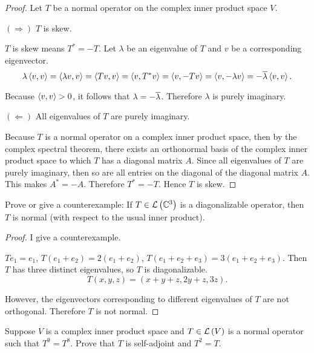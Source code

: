 \begin{proof}
    Let $T$ be a normal operator on the complex inner product space $V$.

    $(\Rightarrow)$ $T$ is skew.

    $T$ is skew means $T^{*} = -T$. Let $\lambda$ be an eigenvalue of $T$ and $v$ be a corresponding eigenvector.
    \[
        \lambda\left\langle{v, v}\right\rangle = \left\langle{\lambda v, v}\right\rangle = \left\langle{Tv, v}\right\rangle = \left\langle{v, T^{*}v}\right\rangle = \left\langle{v, -Tv}\right\rangle = \left\langle{v, -\lambda v}\right\rangle = -\overline{\lambda}\left\langle{v, v}\right\rangle.
    \]

    Because $\left\langle{v, v}\right\rangle > 0$, it follows that $\lambda = -\overline{\lambda}$. Therefore $\lambda$ is purely imaginary.

    $(\Leftarrow)$ All eigenvalues of $T$ are purely imaginary.

    Because $T$ is a normal operator on a complex inner product space, then by the complex spectral theorem, there exists an orthonormal basis of the complex inner product space to which $T$ has a diagonal matrix $A$. Since all eigenvalues of $T$ are purely imaginary, then so are all entries on the diagonal of the diagonal matrix $A$. This makes $A^{*} = -A$. Therefore $T^{*} = -T$. Hence $T$ is skew.
\end{proof}
\newpage

\begin{exercise}
    Prove or give a counterexample: If $T \in \mathcal{L}\left({\mathbb{C}^{3}}\right)$ is a diagonalizable operator, then $T$ is normal (with respect to the usual inner product).
\end{exercise}

\begin{proof}
    I give a counterexample.

    $Te_{1} = e_{1}$, $T(e_{1} + e_{2}) = 2(e_{1} + e_{2})$, $T(e_{1} + e_{2} + e_{3}) = 3(e_{1} + e_{2} + e_{3})$. Then $T$ has three distinct eigenvalues, so $T$ is diagonalizable.
    \[
        T(x, y, z) = (x + y + z, 2y + z, 3z).
    \]

    However, the eigenvectors corresponding to different eigenvalues of $T$ are not orthogonal. Therefore $T$ is not normal.
\end{proof}
\newpage

\begin{exercise}
    Suppose $V$ is a complex inner product space and $T \in \mathcal{L}\left({V}\right)$ is a normal operator such that $T^{9} = T^{8}$. Prove that $T$ is self-adjoint and $T^{2} = T$.
\end{exercise}

